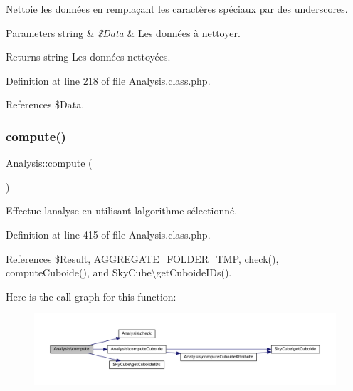 Nettoie les données en remplaçant les caractères spéciaux par des underscores. 
\begin{DoxyParams}[1]{Parameters}
string & {\em \$\+Data} & Les données à nettoyer. \\
\hline
\end{DoxyParams}
\begin{DoxyReturn}{Returns}
string Les données nettoyées. 
\end{DoxyReturn}


Definition at line 218 of file Analysis.\+class.\+php.



References \$\+Data.

\mbox{\label{class_analysis_a034c1e5ed7251cf8ebbe9a2f03ca0785}} 
\subsubsection{\texorpdfstring{compute()}{compute()}}
{\footnotesize\ttfamily Analysis\+::compute (\begin{DoxyParamCaption}{ }\end{DoxyParamCaption})}

Effectue l\textquotesingle{}analyse en utilisant l\textquotesingle{}algorithme sélectionné. 

Definition at line 415 of file Analysis.\+class.\+php.



References \$\+Result, A\+G\+G\+R\+E\+G\+A\+T\+E\+\_\+\+F\+O\+L\+D\+E\+R\+\_\+\+T\+MP, check(), compute\+Cuboide(), and Sky\+Cube\textbackslash{}get\+Cuboide\+I\+Ds().

Here is the call graph for this function\+:\nopagebreak
\begin{figure}[H]
\begin{center}
\leavevmode
\includegraphics[width=350pt]{class_analysis_a034c1e5ed7251cf8ebbe9a2f03ca0785_cgraph}
\end{center}
\end{figure}
\mbox{\label{class_analysis_ad9a44950c6c52270f9734ee4f2b2c05b}} 
